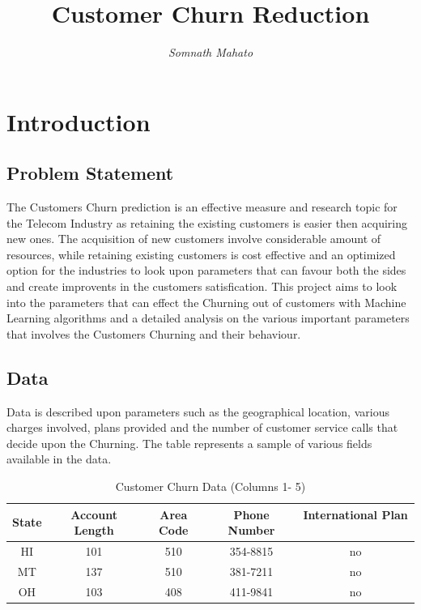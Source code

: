 \documentclass[a4paper,12pt]{report}
\begin{document}
\title{Customer Churn Reduction}
\author{\textit{Somnath Mahato}}
\maketitle





\tableofcontents{}

\chapter{Introduction}


\section{Problem Statement}
The Customers Churn prediction is an effective measure and research topic for the Telecom Industry as retaining the existing customers is easier then acquiring new ones. The acquisition of new customers involve considerable amount of resources, while retaining existing customers is cost effective and an optimized option for the industries to look upon parameters that can favour both the sides and create improvents in the customers satisfication. This project aims to look into the parameters that can effect the Churning out of customers with Machine Learning algorithms and a detailed analysis on the various important parameters that involves the Customers Churning and their behaviour.

\section{Data}
Data is described upon parameters such as the geographical location, various charges involved, plans provided and the number of customer service calls  that decide upon the Churning. The table represents a sample of various fields available in the data. 


\begin{table}[ht]
\caption{Customer Churn Data (Columns 1- 5)} %
\centering %
\begin{tabular}{c c c c c } %
\hline %
State &  Account Length  &  Area Code & Phone Number & International Plan \ \\ [0.5ex] %
\hline %
HI & 101 & 510 & 354-8815 & no\\ %
MT & 137 & 510 & 381-7211 & no\\
OH & 103 & 408 & 411-9841 & no\\ [1ex] %
\hline %
\end{tabular}
\label{table:nonlin} %
\end{table}
\end{document}
